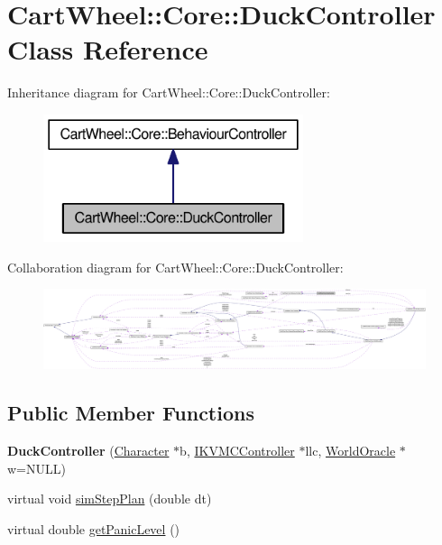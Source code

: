 \hypertarget{classCartWheel_1_1Core_1_1DuckController}{
\section{CartWheel::Core::DuckController Class Reference}
\label{classCartWheel_1_1Core_1_1DuckController}
}


Inheritance diagram for CartWheel::Core::DuckController:\nopagebreak
\begin{figure}[H]
\begin{center}
\leavevmode
\includegraphics[width=216pt]{classCartWheel_1_1Core_1_1DuckController__inherit__graph}
\end{center}
\end{figure}


Collaboration diagram for CartWheel::Core::DuckController:\nopagebreak
\begin{figure}[H]
\begin{center}
\leavevmode
\includegraphics[width=400pt]{classCartWheel_1_1Core_1_1DuckController__coll__graph}
\end{center}
\end{figure}
\subsection*{Public Member Functions}
\begin{DoxyCompactItemize}
\item 
\hypertarget{classCartWheel_1_1Core_1_1DuckController_a260049377c32d342eb5ad0329c8f9209}{
{\bfseries DuckController} (\hyperlink{classCartWheel_1_1Core_1_1Character}{Character} $\ast$b, \hyperlink{classCartWheel_1_1Core_1_1IKVMCController}{IKVMCController} $\ast$llc, \hyperlink{classCartWheel_1_1Core_1_1WorldOracle}{WorldOracle} $\ast$w=NULL)}
\label{classCartWheel_1_1Core_1_1DuckController_a260049377c32d342eb5ad0329c8f9209}

\item 
virtual void \hyperlink{classCartWheel_1_1Core_1_1DuckController_a4f3f53ac7bb338a04e8ee8c1152ca12c}{simStepPlan} (double dt)
\item 
virtual double \hyperlink{classCartWheel_1_1Core_1_1DuckController_a987ea7a8efaad0f2e3467970909877a6}{getPanicLevel} ()
\end{DoxyCompactItemize}
